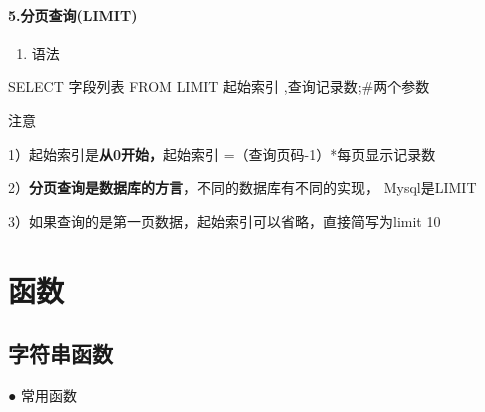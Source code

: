 \documentclass[
  letterpaper,
  DIV=11,
  numbers=noendperiod]{scrreprt}
\let\oldparagraph\paragraph
\renewcommand{\paragraph}[1]{\oldparagraph{#1}\mbox{}}
\newenvironment{Shaded}{\begin{snugshade}}{\end{snugshade}}
\newcommand{\KeywordTok}[1]{\textcolor[rgb]{0.00,0.23,0.31}{#1}}
\newcommand{\NormalTok}[1]{\textcolor[rgb]{0.00,0.23,0.31}{#1}}
\providecommand{\tightlist}{%
  \setlength{\itemsep}{0pt}\setlength{\parskip}{0pt}}\usepackage{longtable,booktabs,array}
\begin{document}
\hypertarget{ux5206ux9875ux67e5ux8be2limit}{%
\paragraph{5.分页查询(LIMIT)}\label{ux5206ux9875ux67e5ux8be2limit}}

\begin{enumerate}
\def\labelenumi{\arabic{enumi}.}
\tightlist
\item
  语法
\end{enumerate}

\begin{Shaded}
\begin{Highlighting}[]
\KeywordTok{SELECT}\NormalTok{ 字段列表 }\KeywordTok{FROM} \KeywordTok{LIMIT}\NormalTok{ 起始索引 ,查询记录数;\#两个参数}
\end{Highlighting}
\end{Shaded}

注意

1）起始索引是\textbf{从0开始，}起始索引 =（查询页码-1）*每页显示记录数

2）\textbf{分页查询是数据库的方言}，不同的数据库有不同的实现，
Mysql是LIMIT

3）如果查询的是第一页数据，起始索引可以省略，直接简写为limit 10

\hypertarget{ux51fdux6570}{%
\section{函数}\label{ux51fdux6570}}

\hypertarget{ux5b57ux7b26ux4e32ux51fdux6570}{%
\subsection{字符串函数}\label{ux5b57ux7b26ux4e32ux51fdux6570}}

\hspace{0pt} ● 常用函数
\end{document}
